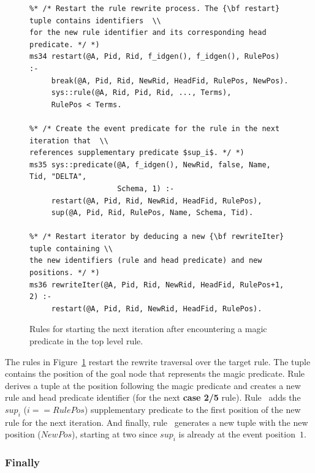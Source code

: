 \begin{figure}
\ssp
\centering
\begin{lstlisting}
%* /* Restart the rule rewrite process. The {\bf restart} tuple contains identifiers  \\
for the new rule identifier and its corresponding head predicate. */ *)
ms34 restart(@A, Pid, Rid, f_idgen(), f_idgen(), RulePos) :-
     break(@A, Pid, Rid, NewRid, HeadFid, RulePos, NewPos).
     sys::rule(@A, Rid, Pid, Rid, ..., Terms),
     RulePos < Terms.
	
%* /* Create the event predicate for the rule in the next iteration that  \\
references supplementary predicate $sup_i$. */ *)
ms35 sys::predicate(@A, f_idgen(), NewRid, false, Name, Tid, "DELTA", 
                    Schema, 1) :-
     restart(@A, Pid, Rid, NewRid, HeadFid, RulePos),
     sup(@A, Pid, Rid, RulePos, Name, Schema, Tid).
	
%* /* Restart iterator by deducing a new {\bf rewriteIter} tuple containing \\
the new identifiers (rule and head predicate) and new positions. */ *)
ms36 rewriteIter(@A, Pid, Rid, NewRid, HeadFid, RulePos+1, 2) :-
     restart(@A, Pid, Rid, NewRid, HeadFid, RulePos).
\end{lstlisting}
\caption{\label{ch:magic:fig:rewrite8}Rules for starting the next iteration after
encountering a magic predicate in the top level rule. }
\end{figure}

The rules in Figure~\ref{ch:magic:fig:rewrite8} restart the rewrite traversal
over the target rule.  The  tuple contains the position of the goal
node that represents the magic predicate.  Rule~ derives a
 tuple at the position following the magic predicate and creates a
new rule and head predicate identifier (for the next {\bf case 2/5} rule).
Rule~ adds the $sup_i$ ($i==RulePos$) supplementary predicate to
the first position of the new rule for the next iteration.  And finally,
rule~ generates a new  tuple with the new position
($NewPos$), starting at two since $sup_{i}$ is already at the event 
position~$1$.

\subsubsection{Finally}

